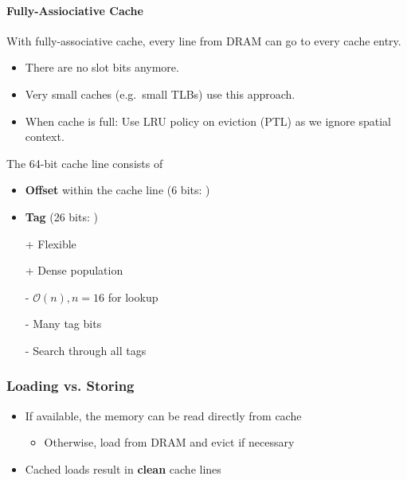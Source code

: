 \paragraph{Fully-Assiociative Cache}
With fully-associative cache, every line from DRAM can go to every cache entry. 
\begin{itemize}
    \item There are no slot bits anymore.
    \item Very small caches (e.g.\ small TLBs) use this approach.
    \item When cache is full: Use LRU policy on eviction (PTL) as we ignore spatial context.
\end{itemize}

\newpar{}
The 64-bit cache line consists of
\begin{itemize}
    \item \textbf{Offset} within the cache line (6 bits: )
    \item \textbf{Tag} (26 bits: )
\end{itemize}

\newpar{}
\begin{itemize}
    \item[+] Flexible
    \item[+] Dense population
    \item[-] $\mathcal{O}(n), n=16$ for lookup
    \item[-] Many tag bits
    \item[-] Search through all tags
\end{itemize}


\subsubsection{Loading vs. Storing}
\begin{itemize}
    \item If available, the memory can be read directly from cache
    \begin{itemize}
        \item Otherwise, load from DRAM and evict if necessary
    \end{itemize}
    \item Cached loads result in \textbf{clean} cache lines
\end{itemize}

